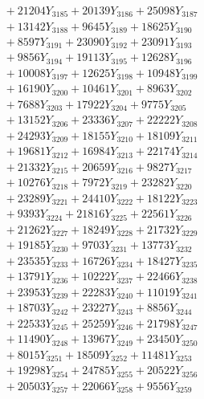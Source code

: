 \documentclass[a4paper,10pt]{article}
\begin{document}
{\begin{align}
&\;  + 21204 Y_{3185} + 20139 Y_{3186} + 25098 Y_{3187} \\[0.3ex]
&\;  + 13142 Y_{3188} + 9645 Y_{3189} + 18625 Y_{3190} \\[0.3ex]
&\;  + 8597 Y_{3191} + 23090 Y_{3192} + 23091 Y_{3193} \\[0.3ex]
&\;  + 9856 Y_{3194} + 19113 Y_{3195} + 12628 Y_{3196} \\[0.3ex]
&\;  + 10008 Y_{3197} + 12625 Y_{3198} + 10948 Y_{3199} \\[0.3ex]
&\;  + 16190 Y_{3200} + 10461 Y_{3201} + 8963 Y_{3202} \\[0.3ex]
&\;  + 7688 Y_{3203} + 17922 Y_{3204} + 9775 Y_{3205} \\[0.3ex]
&\;  + 13152 Y_{3206} + 23336 Y_{3207} + 22222 Y_{3208} \\[0.5ex]\allowbreak
&\;  + 24293 Y_{3209} + 18155 Y_{3210} + 18109 Y_{3211} \\[0.3ex]
&\;  + 19681 Y_{3212} + 16984 Y_{3213} + 22174 Y_{3214} \\[0.3ex]
&\;  + 21332 Y_{3215} + 20659 Y_{3216} + 9827 Y_{3217} \\[0.3ex]
&\;  + 10276 Y_{3218} + 7972 Y_{3219} + 23282 Y_{3220} \\[0.3ex]
&\;  + 23289 Y_{3221} + 24410 Y_{3222} + 18122 Y_{3223} \\[0.3ex]
&\;  + 9393 Y_{3224} + 21816 Y_{3225} + 22561 Y_{3226} \\[0.3ex]
&\;  + 21262 Y_{3227} + 18249 Y_{3228} + 21732 Y_{3229} \\[0.3ex]
&\;  + 19185 Y_{3230} + 9703 Y_{3231} + 13773 Y_{3232} \\[0.3ex]
&\;  + 23535 Y_{3233} + 16726 Y_{3234} + 18427 Y_{3235} \\[0.3ex]
&\;  + 13791 Y_{3236} + 10222 Y_{3237} + 22466 Y_{3238} \\[0.5ex]\allowbreak
&\;  + 23953 Y_{3239} + 22283 Y_{3240} + 11019 Y_{3241} \\[0.3ex]
&\;  + 18703 Y_{3242} + 23227 Y_{3243} + 8856 Y_{3244} \\[0.3ex]
&\;  + 22533 Y_{3245} + 25259 Y_{3246} + 21798 Y_{3247} \\[0.3ex]
&\;  + 11490 Y_{3248} + 13967 Y_{3249} + 23450 Y_{3250} \\[0.3ex]
&\;  + 8015 Y_{3251} + 18509 Y_{3252} + 11481 Y_{3253} \\[0.3ex]
&\;  + 19298 Y_{3254} + 24785 Y_{3255} + 20522 Y_{3256} \\[0.3ex]
&\;  + 20503 Y_{3257} + 22066 Y_{3258} + 9556 Y_{3259} \\[0.3ex]

\end{align}}
\end{document}

